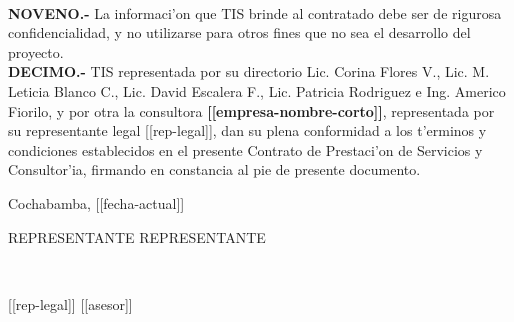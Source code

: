 \documentclass{article}
\newcommand{\fecha}[0]{[[fecha-actual]]}
\newcommand{\empresa}[0]{\textbf{[[empresa-nombre-corto]]}}
\newcommand{\representante}[0]{[[rep-legal]]}
\begin{document}
\\
{\bf{NOVENO.-}}  La informaci'on que TIS brinde al contratado debe ser de rigurosa confidencialidad, y no utilizarse para otros fines que no sea el desarrollo del proyecto.
\\
{\bf{DECIMO.-}} TIS representada por su directorio Lic. Corina Flores V., Lic. M. Leticia Blanco C., Lic. David Escalera F., Lic. Patricia Rodriguez e Ing. Americo Fiorilo, y por otra la consultora \empresa,  representada por su representante legal \representante, dan su plena conformidad a los t'erminos y condiciones establecidos en el presente Contrato de Prestaci'on de Servicios y Consultor'ia, firmando en constancia al pie de presente documento.
\\
\begin{center}{Cochabamba, \fecha}\end{center}
\vspace{20mm}


\begin{center}
REPRESENTANTE   \hspace*{20mm} REPRESENTANTE
\end{center}
  \\
\begin{center}
[[rep-legal]]  \hspace*{20mm}  [[asesor]] 
\end{center}
 \\
\end{document}
